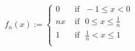 \documentclass[preview]{standalone}
\begin{document}
\begin{align*}
f_{n}(x) := \begin{cases}0  &  \text{ if} \ \ \ -1 \leq x < 0 \\nx &  \text{ if} \ \ \ 0 \leq x \leq \frac{1}{n} \\1 &  \text{ if} \ \ \ \frac{1}{n} < x \leq 1 \\\end{cases}
\end{align*}
\end{document}
